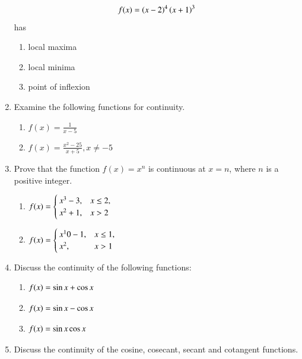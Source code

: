 \begin{enumerate}[label=\arabic*.,ref=\thesubsection.\theenumi]
%
\begin{align}
f(x)  = \left(x-2\right)^4\left(x+1\right)^3
\end{align}
%
has
\begin{enumerate}
\item local maxima
\item local minima
\item point of inflexion
\end{enumerate}
%
\item Examine the following functions for continuity.
%
\begin{enumerate}
\item $f(x) = \frac{1}{x-5}$
\item $f(x) = \frac{x^2-25}{x+5}, x \ne -5$
\end{enumerate}
%
\item Prove that the function $f(x) = x^n$ is continuous at $x = n$, where $n$ is a positive integer.
%
\begin{enumerate}
\item 
$
\begin{alignedat}[t]{2}
f(x)=
\begin{cases}
x^3-3, & x \le 2,
\\
x^2+1, & x > 2
\end{cases}
\end{alignedat}
$
\item 
$
\begin{alignedat}[t]{2}
f(x)=
\begin{cases}
x^10-1, & x \le 1,
\\
x^2, & x > 1
\end{cases}
\end{alignedat}
$
\end{enumerate}
%
\item Discuss the continuity of the following functions:
%
\begin{enumerate}
\item 
$
\begin{alignedat}[t]{2}
f(x)= \sin x + \cos x
\end{alignedat}
$
\item 
$
\begin{alignedat}[t]{2}
f(x)= \sin x - \cos x
\end{alignedat}
$
\item 
$
\begin{alignedat}[t]{2}
f(x)= \sin x \cos x
\end{alignedat}
$
\end{enumerate}
\item Discuss the continuity of the cosine, cosecant, secant and cotangent functions.

\end{enumerate}
